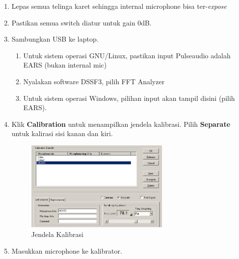 \documentclass[12pt,]{article}
\begin{document}
	\begin{enumerate}
		\item Lepas semua telinga karet sehingga internal microphone bisa ter-\textit{expose}
		\item Pastikan semua switch diatur untuk gain 0dB.
		\item Sambungkan USB ke laptop.
		\begin{enumerate}
			\item Untuk sistem operasi GNU/Linux, pastikan input Pulseaudio adalah EARS (bukan internal mic)
			\item Nyalakan software DSSF3, pilih FFT Analyzer
			\item Untuk sistem operasi Windows, pilihan input akan tampil disini (pilih EARS).	
		\end{enumerate}
		\newpage
		\item Klik \textbf{Calibration} untuk menampilkan jendela kalibrasi.
		Pilih \textbf{Separate} untuk kalirasi sisi kanan dan kiri.
		\begin{figure}[!ht]
			\centering
			\includegraphics[width=200pt]{images/kalib}
			\caption{Jendela Kalibrasi}
		\end{figure}
		\item Masukkan microphone ke kalibrator.
		\begin{figure}[!ht]
			\centering
			\begin{subfigure}[b]{0.2\textwidth}

\end{subfigure}
\end{figure}
\end{enumerate}
\end{document}
